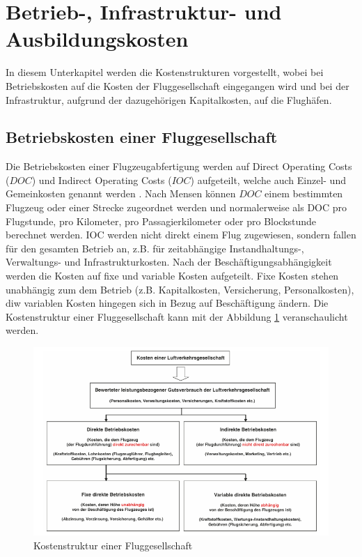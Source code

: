 \section{Betrieb-, Infrastruktur- und Ausbildungskosten}
\label{s:Kosten}
In diesem Unterkapitel werden die Kostenstrukturen vorgestellt, 
wobei bei Betriebskosten auf die Kosten der Fluggesellschaft
eingegangen wird und bei der Infrastruktur, aufgrund der dazugehörigen Kapitalkosten, auf die Flughäfen.
%
\subsection{Betriebskosten einer Fluggesellschaft}

Die Betriebskosten einer Flugzeugabfertigung werden auf Direct Operating Costs ($DOC$) und Indirect Operating Costs 
($IOC$) aufgeteilt, welche auch Einzel- und\\ Gemeinkosten genannt werden \cite{conrady2019luftverkehr}. 
Nach Mensen \cite{mensen2013handbuch} können $DOC$ einem bestimmten Flugzeug oder einer Strecke zugeordnet 
werden und normalerweise als DOC pro Flugstunde, pro Kilometer, pro Passagierkilometer oder pro Blockstunde 
berechnet werden. IOC werden nicht direkt einem Flug zugewiesen, sondern fallen für den gesamten Betrieb an, 
z.B. für zeitabhängige Instandhaltungs-, Verwaltungs- und Infrastrukturkosten. 
Nach der Beschäftigungsabhängigkeit werden die Kosten auf fixe und variable Kosten aufgeteilt. 
Fixe Kosten stehen unabhängig zum dem Betrieb (z.B. Kapitalkosten, Versicherung, Personalkosten), 
diw variablen Kosten hingegen sich in Bezug auf Beschäftigung ändern.
%
Die Kostenstruktur einer Fluggesellschaft kann mit der Abbildung \ref{doc} veranschaulicht werden.
%
\begin{figure}[h]
	\centering
	\includegraphics[width=0.9\linewidth]{Bilder/Systematik der DOC_Berechnung.png}
	\caption[Kostenstruktur einer Fluggesellschaft]{Kostenstruktur einer Fluggesellschaft \cite{mensen2013handbuch}}
	\label{doc}
\end{figure}

